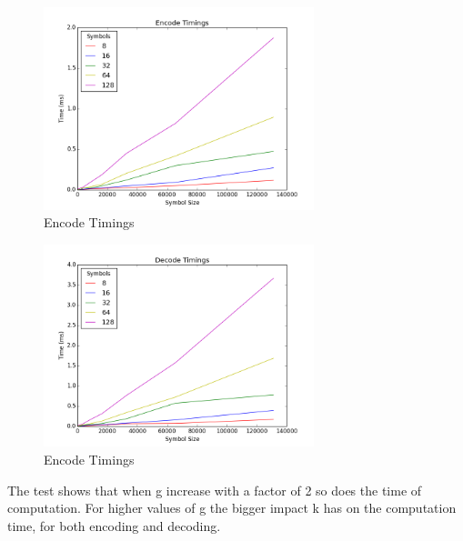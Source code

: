 \begin{figure}[H]
    \centering
    \includegraphics[width=0.7\textwidth]{figures/KodoPython/encode_timings.png}
    \caption{Encode Timings}
    \label{fig:encode_timings}
\end{figure}
\begin{figure}[H]
    \centering
    \includegraphics[width=0.7\textwidth]{figures/KodoPython/decode_timings.png}
    \caption{Encode Timings}
    \label{fig:decode_timings}
\end{figure}

The test shows that when g increase with a factor of 2 so does the time of computation.
For higher values of g the bigger impact k has on the computation time, for both encoding and decoding. 

